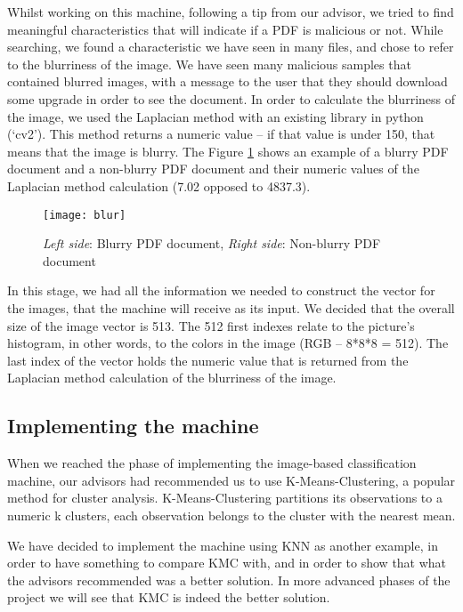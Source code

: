 \documentclass{article}
\begin{document}
\indent Whilst working on this machine, following a tip from our advisor, we tried to find meaningful characteristics that will indicate if a PDF is malicious or not. While searching, we found a characteristic we have seen in many files, and chose to refer to the blurriness of the image. We have seen many malicious samples that contained blurred images, with a message to the user that they should download some upgrade in order to see the document. In order to calculate the blurriness of the image, we used the Laplacian method with an existing library in python (‘cv2’). This method returns a numeric value – if that value is under 150, that means that the image is blurry. The Figure \ref{fig:blur} shows an example of a blurry PDF document and a non-blurry PDF document and their numeric values of the Laplacian method calculation (7.02 opposed to 4837.3).

\begin{figure}[h]
    \centering
    \texttt{[image: blur]}
    \\
    \caption{\textit{Left side}: Blurry PDF document, \textit{Right side}: Non-blurry PDF document}
    \label{fig:blur}
\end{figure}

\indent In this stage, we had all the information we needed to construct the vector for the images, that the machine will receive as its input. We decided that the overall size of the image vector is 513. The 512 first indexes relate to the picture's histogram, in other words, to the colors in the image (RGB – 8*8*8 = 512). The last index of the vector holds the numeric value that is returned from the Laplacian method calculation of the blurriness of the image.

\subsection{Implementing the machine}
\indent When we reached the phase of implementing the image-based classification machine, our advisors had recommended us to use K-Means-Clustering, a popular method for cluster analysis. K-Means-Clustering partitions its observations to a numeric k clusters, each observation belongs to the cluster with the nearest mean.

\indent	We have decided to implement the machine using KNN as another example, in order to have something to compare KMC with, and in order to show that what the advisors recommended was a better solution. In more advanced phases of the project we will see that KMC is indeed the better solution.
\end{document}
